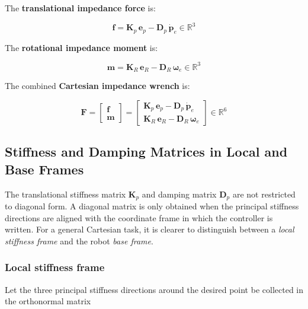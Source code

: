 The \textbf{translational impedance force} is:

\begin{equation}
\label{eq:imp_trans}
\mathbf{f} = \mathbf{K}_p\,\mathbf{e}_p
           - \mathbf{D}_p\,\dot{\mathbf{p}}_e
\in\mathbb{R}^3
\end{equation}

The \textbf{rotational impedance moment} is:

\begin{equation}
\label{eq:imp_rot}
\mathbf{m} = \mathbf{K}_R\,\mathbf{e}_R
           - \mathbf{D}_R\,\boldsymbol{\omega}_e
\in\mathbb{R}^3
\end{equation}

The combined \textbf{Cartesian impedance wrench} is:

\begin{equation}
\label{eq:impedance}
\mathbf{F} =
\begin{bmatrix}
\mathbf{f} \\[2pt] \mathbf{m}
\end{bmatrix}
=
\begin{bmatrix}
\mathbf{K}_p\,\mathbf{e}_p - \mathbf{D}_p\,\dot{\mathbf{p}}_e \\[4pt]
\mathbf{K}_R\,\mathbf{e}_R - \mathbf{D}_R\,\boldsymbol{\omega}_e
\end{bmatrix}
\in\mathbb{R}^6
\end{equation}


\subsection{Stiffness and Damping Matrices in Local and Base Frames}
\label{subsec:KD_matrices}

The translational stiffness matrix \(\mathbf{K}_p\) and damping matrix
\(\mathbf{D}_p\) are not restricted to diagonal form. A diagonal matrix is only
obtained when the principal stiffness directions are aligned with the coordinate
frame in which the controller is written. For a general Cartesian task, it is
clearer to distinguish between a \emph{local stiffness frame} and the robot
\emph{base frame}.

\subsubsection*{Local stiffness frame}

Let the three principal stiffness directions around the desired point be
collected in the orthonormal matrix

